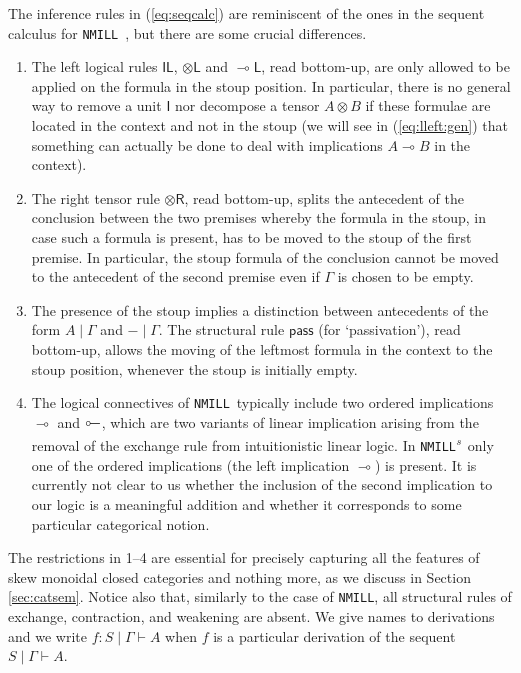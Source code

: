 \documentclass[copyright,creativecommons]{eptcs}
\theoremstyle{definition}
\newcommand{\tl}{\otimes \mathsf{L}}
\newcommand{\tr}{\otimes \mathsf{R}}
\newcommand{\lleft}{{\multimap}\mathsf{L}}
\newcommand{\pass}{\mathsf{pass}}
\newcommand{\unitl}{\mathsf{IL}}
\newcommand{\ot}{\otimes}
\newcommand{\lolli}{\multimap}
\newcommand{\illol}{\rotatebox[origin=c]{180}{$\multimap$}}
\newcommand{\I}{\mathsf{I}}
\newcommand{\NMILL}{\texttt{NMILL}}
\newcommand{\SkNMILL}{\NMILL\textsuperscript{\textit{s}}}
\newcommand{\niccolo}[1]{{\color{red}\textbf{Niccol{\`o}: }#1}}
\begin{document}

The inference rules in (\ref{eq:seqcalc}) are reminiscent of the ones in the sequent calculus for \NMILL\ \cite{abrusci:noncommutative:1990}, but there are some crucial differences.
\begin{enumerate}
\item The left logical rules $\unitl$, $\tl$ and $\lleft$, read bottom-up, are only allowed to be applied on the formula in the stoup position. In particular, there is no general way to remove a unit $\I$ nor decompose a tensor $A \ot B$ if these formulae are located in the context and not in the stoup (we will see in (\ref{eq:lleft:gen}) that something can actually be done to deal with implications $A \lolli B$ in the context).
\item The right tensor rule $\tr$, read bottom-up, splits the antecedent of the conclusion between the two premises whereby the formula in the stoup, in case such a formula is present, has to be moved to the stoup of the first premise. In particular, the stoup formula of the conclusion cannot be moved to the antecedent of the second premise even if $\Gamma$ is chosen to be empty. 
\item The presence of the stoup implies a distinction between antecedents of the form $A \mid \Gamma$ and ${-} \mid \Gamma$. The structural rule $\pass$ (for `passivation'), read bottom-up, allows the moving of the leftmost formula in the context to the stoup position, whenever the stoup is initially empty.
\item The logical connectives of \NMILL\ typically include two ordered implications $\lolli$ and $\illol$, which are two variants of linear implication arising from the removal of the exchange rule from intuitionistic linear logic. In \SkNMILL\ only one of the ordered implications (the left implication $\lolli$) is present. It is currently not clear to us whether the inclusion of the second implication to our logic is a meaningful addition and whether it corresponds to some particular categorical notion.
\end{enumerate}
The restrictions in 1--4 are essential for precisely capturing all the features of skew monoidal closed categories and nothing more, as we discuss in Section \ref{sec:catsem}.
Notice also that, similarly to the case of \NMILL, all structural rules of exchange, contraction, and weakening are absent. We give names to derivations and we write $f : S \mid \Gamma \vdash A$ when $f$ is a particular derivation of the sequent $S \mid \Gamma \vdash A$.
\end{document}
